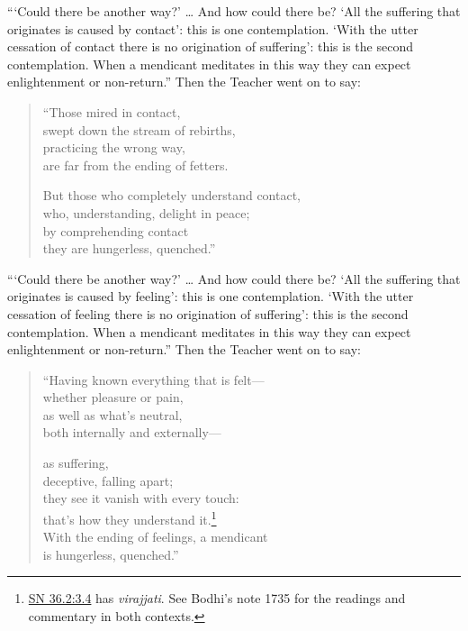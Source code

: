 \documentclass[12pt,openany]{book}%
\begin{document}
“‘Could there be another way?’ … And how could there be? ‘All the suffering that originates is caused by contact’: this is one contemplation. ‘With the utter cessation of contact there is no origination of suffering’: this is the second contemplation. When a mendicant meditates in this way they can expect enlightenment or non-return.” Then the Teacher went on to say: 

\begin{verse}%
“Those mired in contact, \\
swept down the stream of rebirths, \\
practicing the wrong way, \\
are far from the ending of fetters. 

But those who completely understand contact, \\
who, understanding, delight in peace; \\
by comprehending contact \\
they are hungerless, quenched.” 

%
\end{verse}

“‘Could there be another way?’ … And how could there be? ‘All the suffering that originates is caused by feeling’: this is one contemplation. ‘With the utter cessation of feeling there is no origination of suffering’: this is the second contemplation. When a mendicant meditates in this way they can expect enlightenment or non-return.” Then the Teacher went on to say: 

\begin{verse}%
“Having known everything that is felt—\\
whether pleasure or pain, \\
as well as what’s neutral, \\
both internally and externally—

as suffering, \\
deceptive, falling apart; \\
they see it vanish with every touch: \\
that’s how they understand it.\footnote{\href{https://suttacentral.net/sn36.2/en/sujato\#3.4}{SN 36.2:3.4} has \textit{virajjati}. See Bodhi’s note 1735 for the readings and commentary in both contexts. } \\
With the ending of feelings, a mendicant \\
is hungerless, quenched.” 

%
\end{verse}
\end{document}
